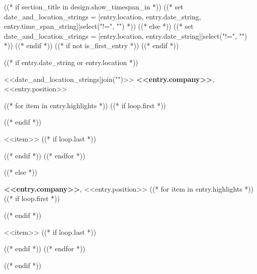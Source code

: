 ((* if section_title in design.show_timespan_in *))
    ((* set date_and_location_strings = [entry.location, entry.date_string, entry.time_span_string]|select("!=", "") *))
((* else *))
    ((* set date_and_location_strings = [entry.location, entry.date_string]|select("!=", "") *))
((* endif *))
((* if not is_first_entry *))
\vspace{<<design.margins.entry_area.vertical_between>>}
((* endif *))

((* if entry.date_string or entry.location *))
\begin{twocolentry}{
    <<date_and_location_strings|join("\n\n")>>
}
    \textbf{<<entry.company>>}, <<entry.position>>
\end{twocolentry}
\begin{onecolentry}
    ((* for item in entry.highlights *))
        ((* if loop.first *))
    \begin{highlights}
        ((* endif *))
        \item <<item>>
        ((* if loop.last *))
    \end{highlights}
        ((* endif *))
    ((* endfor *))
\end{onecolentry}
((* else *))
\begin{onecolentry}
    \textbf{<<entry.company>>}, <<entry.position>>
    ((* for item in entry.highlights *))
        ((* if loop.first *))
    \begin{highlights}
        ((* endif *))
        \item <<item>>
        ((* if loop.last *))
    \end{highlights}
        ((* endif *))
    ((* endfor *))
\end{onecolentry}
((* endif *))

